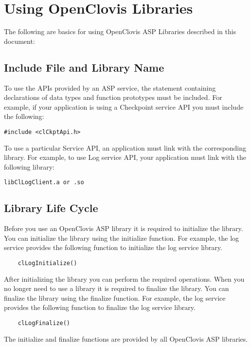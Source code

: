 \section{Using OpenClovis Libraries}
\begin{flushleft}
The following are basics for using OpenClovis ASP Libraries described in this document:

\subsection{Include File and Library Name}
To use the APIs provided by an ASP service, the statement containing declarations of data types and function prototypes
must be included. 
\newline
For example, if your application is using a Checkpoint service API you must include the following:
\footnotesize 
\begin{verbatim} 
#include <clCkptApi.h>
\end{verbatim}
\normalsize
\par
\par
To use a particular Service API, an application must link with the corresponding 
library. 
\newline
For example, to use Log service API, your application must link with the following library:
\footnotesize 
\begin{verbatim} 
libClLogClient.a or .so
\end{verbatim}
\normalsize
\par


\subsection{Library Life Cycle}
Before you use an OpenClovis ASP library it is required to initialize the library. 
You can initialize the library using the initialize function. 
\newline
For example, the log service provides the following function to initialize the log service library.
\footnotesize 
\begin{verbatim} 
	clLogInitialize()
	\end{verbatim}
	\normalsize
	
After initializing the library you can perform the required operations. 
When you no longer need to use a library it is required to finalize the library. 
You can finalize the library using the finalize function. 
\newline
For example, the log service provides the following function to finalize the log service library.
\footnotesize 
\begin{verbatim} 
	clLogFinalize()
	\end{verbatim}
	\normalsize
The initialize and finalize functions are provided by all OpenClovis ASP libraries. 
\end{flushleft}
